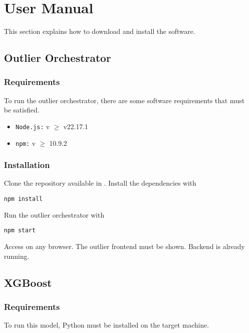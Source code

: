 \chapter{User Manual}

This section explains how to download and install the software.

\section{Outlier Orchestrator}

\subsection{Requirements}

To run the outlier orchestrator, there are some software requirements that must be satisfied.

\begin{itemize}
    \item \texttt{Node.js:} v $\geq$ v22.17.1
    \item \texttt{\ac{npm}:} v $\geq$ 10.9.2
\end{itemize}

\subsection{Installation}

Clone the repository available in . Install the dependencies with 

\begin{lstlisting}[caption={Using \ac{npm} to install dependencies}]
    npm install 
\end{lstlisting}

Run the outlier orchestrator with

\begin{lstlisting}[caption={Running the outlier orchestrator}]
    npm start
\end{lstlisting}

Access  on any browser. The outlier frontend must be shown. Backend is already running.

\section{XGBoost}

\subsection{Requirements}

To run this model, Python must be installed on the target machine.

